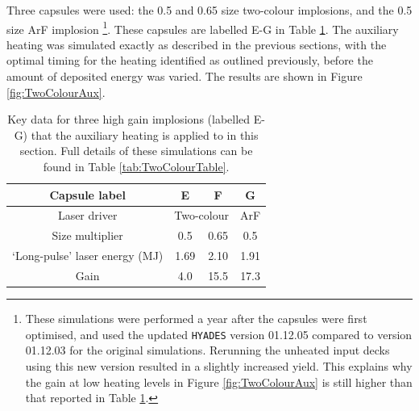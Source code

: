 Three capsules were used: the 0.5 and 0.65 size two-colour implosions, and the 0.5 size ArF implosion \footnote{These simulations were performed a year after the capsules were first optimised, and used the updated \texttt{HYADES} version 01.12.05 compared to version 01.12.03 for the original simulations. Rerunning the unheated input decks using this new version resulted in a slightly increased yield. This explains why the gain at low heating levels in Figure \ref{fig:TwoColourAux} is still higher than that reported in Table \ref{tab:Heating two colour capsules}.}.  These capsules are labelled E-G in Table \ref{tab:Heating two colour capsules}. The auxiliary heating was simulated exactly as described in the previous sections, with the optimal timing for the heating identified as outlined previously, before the amount of deposited energy was varied. The results are shown in Figure \ref{fig:TwoColourAux}.

\begin{table}
\centering
\begin{tabular}{|c|c|c|c|}
\hline
Capsule label &  E & F & G  \\ 
\hline
Laser driver & \multicolumn{2}{c|}{Two-colour} & ArF \\ 
\hline
Size multiplier & 0.5 & 0.65 & 0.5 \\
\hline
`Long-pulse' laser energy (MJ) & 1.69  & 2.10 & 1.91 \\ 
Gain & 4.0 & 15.5 & 17.3 \\ 
\hline
  \end{tabular}
  \caption{Key data for three high gain implosions (labelled E-G) that the auxiliary heating is applied to in this section. Full details of these simulations can be found in Table \ref{tab:TwoColourTable}.}
  \label{tab:Heating two colour capsules}
\end{table}

